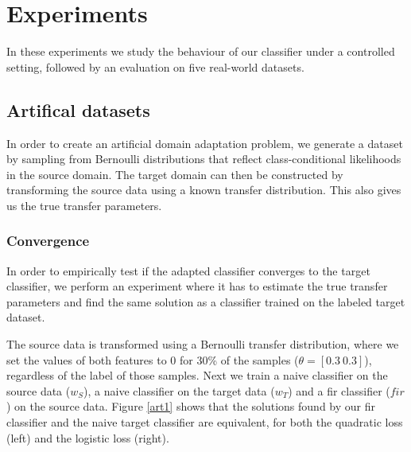 \documentclass[twoside,11pt]{article}
\begin{document}
\section{Experiments}
In these experiments we study the behaviour of our classifier under a controlled setting, followed by an evaluation on five real-world datasets.

\subsection{Artifical datasets}
In order to create an artificial domain adaptation problem, we generate a dataset by sampling from Bernoulli distributions that reflect class-conditional likelihoods in the source domain. The target domain can then be constructed by transforming the source data using a known transfer distribution. This also gives us the true transfer parameters.

\subsubsection{Convergence}
In order to empirically test if the adapted classifier converges to the target classifier, we perform an experiment where it has to estimate the true transfer parameters and find the same solution as a classifier trained on the labeled target dataset.

The source data is transformed using a Bernoulli transfer distribution, where we set the values of both features to 0 for 30\% of the samples ($\theta= [0.3 \ 0.3]$), regardless of the label of those samples. Next we train a naive classifier on the source data ($w_{S}$), a naive classifier on the target data ($w_{T}$) and a fir classifier ($fir$) on the source data. Figure \ref{art1} shows that the solutions found by our fir classifier and the naive target classifier are equivalent, for both the quadratic loss (left) and the logistic loss (right).
\end{document}
